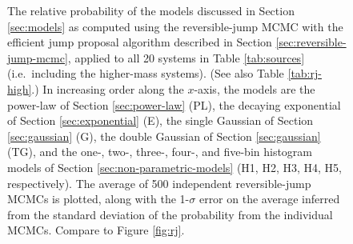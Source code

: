 \documentclass[preprint]{aastex}
\begin{document}
\begin{figure}
  \begin{center}
  \end{center}
  \caption{\label{fig:high-rj-evidence} The relative probability of
    the models discussed in Section \ref{sec:models} as computed using
    the reversible-jump MCMC with the efficient jump proposal
    algorithm described in Section \ref{sec:reversible-jump-mcmc},
    applied to all 20 systems in Table \ref{tab:sources} (i.e.\
    including the higher-mass systems).  (See also Table
    \ref{tab:rj-high}.)  In increasing order along the $x$-axis, the
    models are the power-law of Section \ref{sec:power-law} (PL), the
    decaying exponential of Section \ref{sec:exponential} (E), the
    single Gaussian of Section \ref{sec:gaussian} (G), the double
    Gaussian of Section \ref{sec:gaussian} (TG), and the one-, two-,
    three-, four-, and five-bin histogram models of Section
    \ref{sec:non-parametric-models} (H1, H2, H3, H4, H5,
    respectively).  The average of 500 independent reversible-jump
    MCMCs is plotted, along with the 1-$\sigma$ error on the average
    inferred from the standard deviation of the probability from the
    individual MCMCs.  Compare to Figure \ref{fig:rj}.}
\end{figure}
\end{document}
